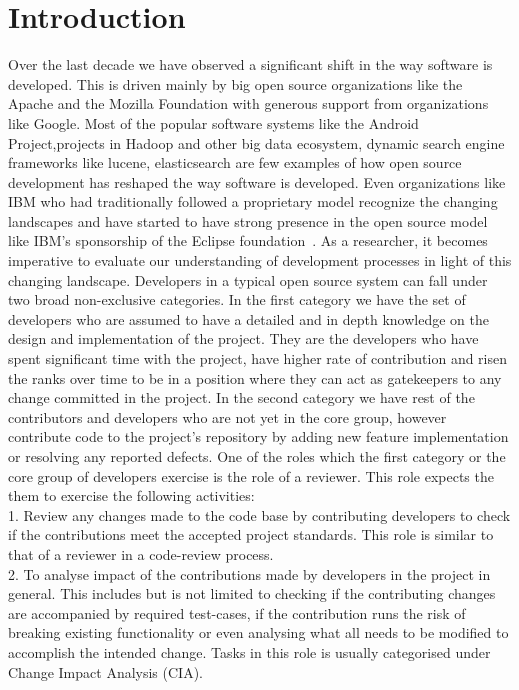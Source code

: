
\section{Introduction}
\label{sec:intro}

Over the last decade we have observed a significant shift in the way software is developed. This is driven mainly by big open source organizations like the Apache and the Mozilla Foundation with generous support from organizations like Google. Most of the popular software systems like the Android Project,projects in Hadoop and other big data ecosystem, dynamic search engine frameworks like lucene, elasticsearch are few examples of how open source development has reshaped the way software is developed. Even organizations like IBM who had traditionally followed a proprietary model recognize the changing landscapes and have started to have strong presence in the open source model like IBM's sponsorship of the Eclipse foundation~\cite{Eclipse}. As a researcher, it becomes imperative to evaluate our understanding of development processes in light of this changing landscape.
Developers in a typical open source system can fall under two broad non-exclusive categories. In the first category we have the set of developers who are assumed to have a detailed and in depth knowledge on the design and implementation of the project. They are the developers who have spent significant time with the project, have higher rate of contribution and risen the ranks over time to be in a position where they can act as gatekeepers to any change committed in the project. In the second category we have rest of the contributors and developers who are not yet in the core group, however contribute code to the project's  repository by adding new feature implementation or resolving any reported defects. One of the roles which the first category or the core group of developers exercise is the role of a reviewer. This role expects the them to exercise the following activities:\\
1. Review any changes made to the code base by contributing developers to check if the contributions meet the accepted project standards. This role is similar to that of a reviewer in a code-review process.\\
2. To analyse impact of the contributions made by developers in the project in general. This includes but is not limited to checking if the contributing changes are accompanied by required test-cases, if the contribution runs the risk of breaking existing functionality or even analysing what all needs to be modified to accomplish the intended change. Tasks in this role is usually categorised under Change Impact Analysis (CIA).~\cite{STVSTVR1475} \\

